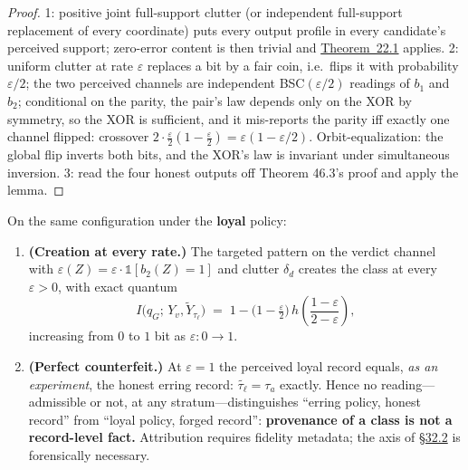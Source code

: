 \begin{proof}

1: positive joint full-support clutter (or independent full-support replacement of every coordinate) puts every output profile in every candidate's perceived support; zero-error content is then trivial and \hyperlink{stmt:22.1}{Theorem~22.1} applies. 2: uniform clutter at rate \(\varepsilon\) replaces a bit by a fair coin, i.e.~flips it with probability \(\varepsilon/2\); the two perceived channels are independent BSC\((\varepsilon/2)\) readings of \(b_1\) and \(b_2\); conditional on the parity, the pair's law depends only on the XOR by symmetry, so the XOR is sufficient, and it mis-reports the parity iff exactly one channel flipped: crossover \(2\cdot\tfrac{\varepsilon}{2}(1 - \tfrac{\varepsilon}{2}) = \varepsilon(1-\varepsilon/2)\). Orbit-equalization: the global flip inverts both bits, and the XOR's law is invariant under simultaneous inversion. 3: read the four honest outputs off Theorem 46.3's proof and apply the lemma.
\end{proof}

\begin{thmplain}

On the same configuration under the \textbf{loyal} policy:

\begin{enumerate}
\def\labelenumi{\arabic{enumi}.}
\item
  \textbf{(Creation at every rate.)} The targeted pattern on the verdict channel with \(\varepsilon(Z) = \varepsilon \cdot \mathbb{1}[b_2(Z) = 1]\) and clutter \(\delta_d\) creates the class at every \(\varepsilon > 0\), with exact quantum
  \[
  I\big(q_G;\, Y_v, \widetilde{Y}_{\tau_\ell}\big) \;=\; 1 - \big(1 - \tfrac{\varepsilon}{2}\big)\, h\!\left(\frac{1-\varepsilon}{2 - \varepsilon}\right),
  \]
  increasing from \(0\) to \(1\) bit as \(\varepsilon: 0 \to 1\).
\item
  \textbf{(Perfect counterfeit.)} At \(\varepsilon = 1\) the perceived loyal record equals, \emph{as an experiment}, the honest erring record: \(\widetilde{\tau_\ell} = \tau_a\) exactly. Hence no reading---\hspace{0pt}admissible or not, at any stratum---\hspace{0pt}distinguishes ``erring policy, honest record'' from ``loyal policy, forged record'': \textbf{provenance of a class is not a record-level fact.} Attribution requires fidelity metadata; the axis of \hyperlink{sec:32.2}{§32.2} is forensically necessary.
\end{enumerate}
\end{thmplain}

